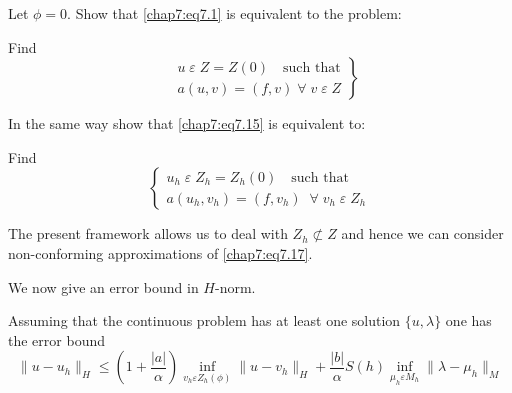 \begin{exercise}\label{chap7:exr2}
Let $\phi =0$. Show that \eqref{chap7:eq7.1} is equivalent to the
problem:

Find
\begin{equation}\label{chap7:eq7.17}
\left.
\begin{aligned}
& u\;\varepsilon\;Z=Z(0)\quad\text{such that}\\
& a(u,v)=(f,v)\;\forall\;v\;\varepsilon\;Z
\end{aligned}
\right\}
\end{equation}

In the same way show that \eqref{chap7:eq7.15} is equivalent to:

Find 
\begin{equation}\label{chap7:eq7.18}
\begin{cases}
u_h\;\varepsilon\;Z_h=Z_h(0)\quad\text{such that}\\
a(u_h,v_h)=(f,v_h)\; \; \forall\;v_h\;\varepsilon\;Z_h
\end{cases}
\end{equation}\pageoriginale

The present framework allows us to deal with $Z_h\nsubset Z$ and hence
we can consider non-conforming approximations of
\eqref{chap7:eq7.17}. 

We now give an error bound in $H$-norm.
\end{exercise}

\begin{THM}\label{chap7:THM2}
Assuming that the continuous problem has at least one solution
$\{u,\lambda\}$ one has the error bound
\begin{equation}\label{chap7:eq7.19}
\parallel u-u_h\parallel_H\leq\left(1+\frac{|a|}{\alpha}\right)
\inf\limits_{v_h\varepsilon Z_h(\phi)}\parallel u-v_h\parallel_H+
\frac{|b|}{\alpha}S(h)\inf\limits_{\mu_h\varepsilon M_h}\parallel
\lambda-\mu_h\parallel_M 
\end{equation}
\end{THM}

